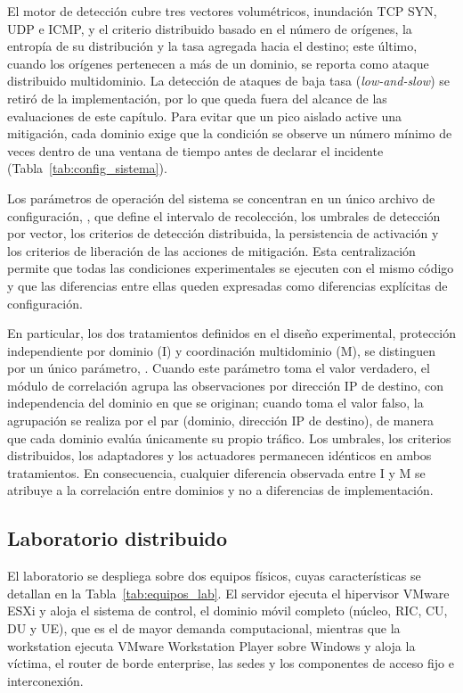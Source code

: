 El motor de detección cubre tres vectores volumétricos, inundación TCP SYN, UDP e ICMP, y el criterio distribuido basado en el número de orígenes, la entropía de su distribución y la tasa agregada hacia el destino; este último, cuando los orígenes pertenecen a más de un dominio, se reporta como ataque distribuido multidominio. La detección de ataques de baja tasa (\textit{low-and-slow}) se retiró de la implementación, por lo que queda fuera del alcance de las evaluaciones de este capítulo. Para evitar que un pico aislado active una mitigación, cada dominio exige que la condición se observe un número mínimo de veces dentro de una ventana de tiempo antes de declarar el incidente (Tabla~\ref{tab:config_sistema}).

Los parámetros de operación del sistema se concentran en un único archivo de configuración, , que define el intervalo de recolección, los umbrales de detección por vector, los criterios de detección distribuida, la persistencia de activación y los criterios de liberación de las acciones de mitigación. Esta centralización permite que todas las condiciones experimentales se ejecuten con el mismo código y que las diferencias entre ellas queden expresadas como diferencias explícitas de configuración.

En particular, los dos tratamientos definidos en el diseño experimental, protección independiente por dominio (I) y coordinación multidominio (M), se distinguen por un único parámetro, . Cuando este parámetro toma el valor verdadero, el módulo de correlación agrupa las observaciones por dirección IP de destino, con independencia del dominio en que se originan; cuando toma el valor falso, la agrupación se realiza por el par (dominio, dirección IP de destino), de manera que cada dominio evalúa únicamente su propio tráfico. Los umbrales, los criterios distribuidos, los adaptadores y los actuadores permanecen idénticos en ambos tratamientos. En consecuencia, cualquier diferencia observada entre I y M se atribuye a la correlación entre dominios y no a diferencias de implementación.

\subsection{Laboratorio distribuido}
\label{subsec:laboratorio}

El laboratorio se despliega sobre dos equipos físicos, cuyas características se detallan en la Tabla~\ref{tab:equipos_lab}. El servidor ejecuta el hipervisor VMware ESXi y aloja el sistema de control, el dominio móvil completo (núcleo, RIC, CU, DU y UE), que es el de mayor demanda computacional, mientras que la workstation ejecuta VMware Workstation Player sobre Windows y aloja la víctima, el router de borde enterprise, las sedes y los componentes de acceso fijo e interconexión.

